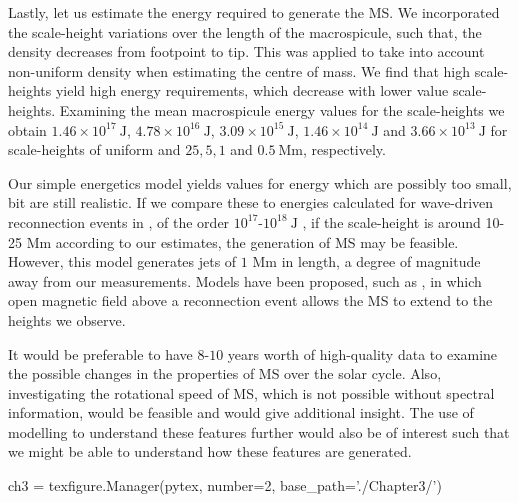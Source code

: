 Lastly, let us estimate the energy required to generate the MS. We incorporated the scale-height variations over the length of the macrospicule, such that, the density decreases from footpoint to tip. This was applied to take into account non-uniform density when estimating the centre of mass. 
We find that high scale-heights yield high energy requirements, which decrease with lower value scale-heights.
Examining the mean macrospicule energy values for the scale-heights we obtain $1.46 \times 10^{17}\ \textrm{J}$, $4.78 \times 10^{16}\ \textrm{J}$,  $3.09 \times 10^{15}\ \textrm{J}$, $1.46 \times 10^{14}\ \textrm{J}$ and $3.66 \times 10^{13}\ \textrm{J}$ for scale-heights of uniform and $25, 5, 1$ and $0.5\ \textrm{Mm}$, respectively.

Our simple energetics model yields values for energy which are possibly too small, bit are still realistic. If we compare these to energies calculated for wave-driven reconnection events in \cite{Heggland2009}, of the order $10^{17}$-$10^{18}\ \textrm{J}$ , if the scale-height is around 10-25 Mm according to our estimates, the generation of MS may be feasible. However, this model generates jets of $1$ Mm in length, a degree of magnitude away from our measurements. Models have been proposed, such as \cite{Adams2014}, in which open magnetic field above a reconnection event allows the MS to extend to the heights we observe.

It would be preferable to have $8$-$10$ years worth of high-quality data to examine the possible changes in the properties of MS over the solar cycle. Also, investigating the rotational speed of MS, which is not possible without spectral information, would be feasible and would give additional insight. The use of modelling to understand these features further would also be of interest such that we might be able to understand how these features are generated.  



\begin{pycode}[chapter3]
ch3 = texfigure.Manager(pytex, number=2, base_path='./Chapter3/')
\end{pycode}
